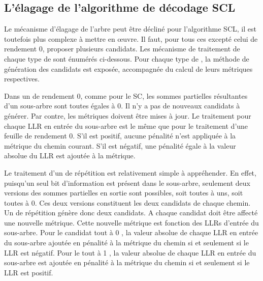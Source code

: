 \subsection{L'élagage de l'algorithme de décodage SCL}

Le mécanisme d'élagage de l'arbre peut être décliné pour l'algorithme SCL, il est toutefois plus complexe à mettre en œuvre. Il faut, pour tous ces \noeud excepté celui de rendement 0, proposer plusieurs candidats. Les mécanisme de traitement de chaque type de \noeud sont énumérés ci-dessous. Pour chaque type de \noeud, la méthode de génération des candidats est exposée, accompagnée du calcul de leurs métriques respectives.

Dans un \noeud de rendement 0, comme pour le SC, les sommes partielles résultantes d'un sous-arbre sont toutes égales à 0. Il n'y a pas de nouveaux candidats à générer. Par contre, les métriques doivent être mises à jour. Le traitement pour chaque LLR en entrée du sous-arbre est le même que pour le traitement d'une feuille de rendement 0. S'il est positif, aucune pénalité n'est appliquée à la métrique du chemin courant. S'il est négatif, une pénalité égale à la valeur absolue du LLR est ajoutée à la métrique. 

Le traitement d'un \noeud de répétition est relativement simple à appréhender. En effet, puisqu'un seul bit d'information est présent dans le sous-arbre, seulement deux versions des sommes partielles en sortie sont possibles, soit toutes à uns, soit toutes à 0. Ces deux versions constituent les deux candidats de chaque chemin. Un \noeud de répétition génère donc deux candidats. A chaque candidat doit être affecté une nouvelle métrique. Cette nouvelle métrique est fonction des LLRs d'entrée du sous-arbre. Pour le candidat \og tout à 0 \fg, la valeur absolue de chaque LLR en entrée du sous-arbre ajoutée en pénalité à la métrique du chemin si et seulement si le LLR est négatif. Pour le \noeud \og tout à 1 \fg, la valeur absolue de chaque LLR en entrée du sous-arbre est ajoutée en pénalité à la métrique du chemin si et seulement si le LLR est positif.

